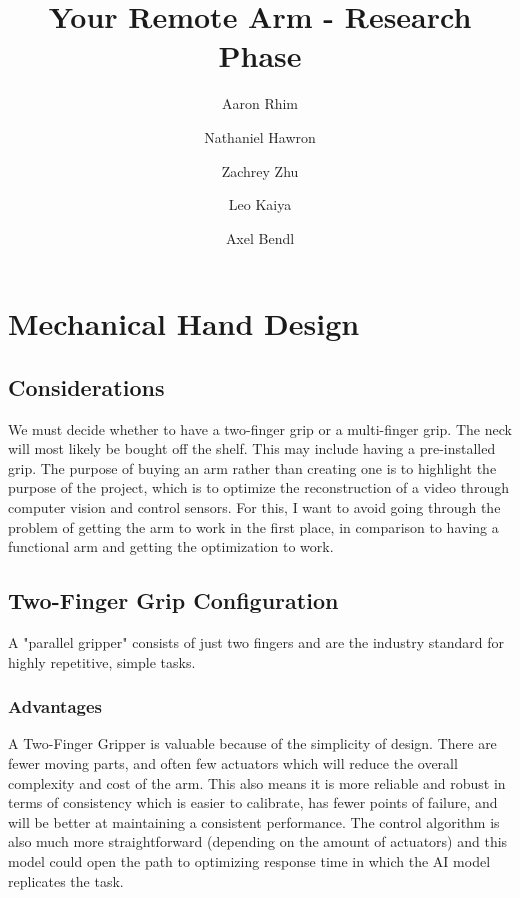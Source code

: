 \documentclass[document]{llncs}
\begin{document}
%
\title{Your Remote Arm - Research Phase}
%
%
\author{Aaron Rhim \and
Nathaniel Hawron\and
Zachrey Zhu\and
Leo Kaiya\and
Axel Bendl}

%
%
%
\maketitle              %
%
%
%
%
\section{Mechanical Hand Design}
\subsection{Considerations}
We must decide whether to have a two-finger grip or a multi-finger grip. The neck will most likely be bought off the shelf. This may include having a pre-installed grip. The purpose of buying an arm rather than creating one is to highlight the purpose of the project, which is to optimize the reconstruction of a video through computer vision and control sensors. For this, I want to avoid going through the problem of getting the arm to work in the first place, in comparison to having a functional arm and getting the optimization to work.

\subsection{Two-Finger Grip Configuration}
A "parallel gripper" consists of just two fingers and are the industry standard for highly repetitive, simple tasks.

\subsubsection{Advantages}
A Two-Finger Gripper is valuable because of the simplicity of design. There are fewer moving parts, and often few actuators which will reduce the overall complexity and cost of the arm. This also means it is more reliable and robust in terms of consistency which is easier to calibrate, has fewer points of failure, and will be better at maintaining a consistent performance. The control algorithm is also much more straightforward (depending on the amount of actuators) and this model could open the path to optimizing response time in which the AI model replicates the task.
\end{document}
